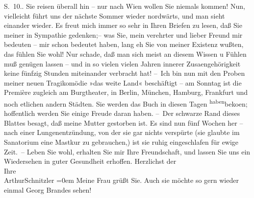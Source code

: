 \begin{ledgroupsized}[t]{13cm}
{{{                     S. 10.}}}\label{K_L02035-1h}.\pend
           \pstart
           Sie reisen überall hin – nur nach Wien wollen Sie
               niemals kommen! Nun, vielleicht führt uns der nächste Sommer wieder nordwärts, und
               man sieht einander wieder. Es freut mich immer so sehr in Ihren Briefen zu lesen, daß
               Sie meiner {\pb}in Sympathie gedenken;– was Sie, mein
               verehrter und lieber Freund mir bedeuten – mir schon bedeutet haben, lang eh Sie von
               meiner Existenz wußten, das fühlen Sie wohl! Nur schade, daß man sich meist an diesem
               Wissen u Fühlen muß genügen lassen – und in so vielen vielen Jahren innerer Zusa{\geminationm}engehörigkeit keine fünfzig Stunden miteinander
               verbracht hat!\pend
           \pstart
           – Ich bin nun mit den Proben meiner {\pb}neuen
               Tragikomödie »das weite Land« beschäftigt – am
               Sonntag ist die Première zugleich am Burgtheater,
               in Berlin, München, Hamburg, Frankfurt und noch etlichen andern Städten. Sie werden das Buch in diesen Tagen \substVorne{}\textsuperscript{haben}\substDazwischen{}beko{\geminationm}en\substHinten{}; hoffentlich werden Sie einige Freude daran haben.\pend
           \pstart
           – Der schwarze Rand dieses Blattes besagt, daß meine Mutter gestorben ist. Es sind nun fünf
               Wochen her – nach einer {\pb}Lungenentzündung, von der
               sie gar nichts verspürte (sie glaubte im Sanatorium eine Mastkur zu gebrauchen,) ist
               sie ruhig eingeschlafen für ewige Zeit. –\pend
           \pstart
           Leben Sie wohl, erhalten Sie mir Ihre Freundschaft, und lassen Sie uns ein
               Wiedersehen in guter Gesundheit erhoffen.\pend
           \pstart
           Herzlichst der{\\[\baselineskip]}Ihre{\\[\baselineskip]}\spacefill\mbox{ArthurSchnitzler}\pend
           \leftskip=0em{}\pstart
           \noindent{}Meine Frau grüßt Sie. Auch
                  sie möchte so gern wieder einmal Georg Brandes sehen!\pend
           

\end{ledgroupsized}
